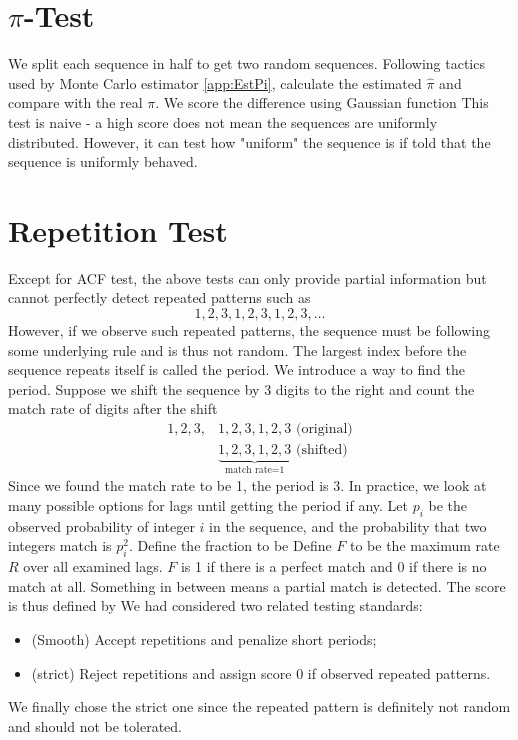 \documentclass{report}
\begin{document}
\section{$\pi$-Test}
We split each sequence in half to get two random sequences. Following tactics used by Monte Carlo estimator \eqref{app:EstPi}, calculate the estimated $\hat{\pi}$ and compare with the real $\pi$. We score the difference using Gaussian function
This test is naive - a high score does not mean the sequences are uniformly distributed. However, it can test how "uniform" the sequence is if told that the sequence is uniformly behaved.

\section{Repetition Test}
Except for ACF test, the above tests can only provide partial information but cannot perfectly detect repeated patterns such as
\[1,2,3,1,2,3,1,2,3,\dots\]
However, if we observe such repeated patterns, the sequence must be following some underlying rule and is thus not random. The largest index before the sequence repeats itself is called the period. We introduce a way to find the period. Suppose we shift the sequence by 3 digits to the right and count the match rate of digits after the shift
\begin{align*}
    1,2,3,&1,2,3,1,2,3 \text{ (original)}\\
    &\underbrace{1,2,3,1,2,3}_{\text{match rate=1}} \text{ (shifted)}
\end{align*}
Since we found the match rate to be 1, the period is 3. In practice, we look at many possible options for lags until getting the period if any. Let $p_i$ be the observed probability of integer $i$ in the sequence, and the probability that two integers match is $p_i^2$. Define the fraction to be
Define $F$ to be the maximum rate $R$ over all examined lags. $F$ is 1 if there is a perfect match and 0 if there is no match at all. Something in between means a partial match is detected. The score is thus defined by
We had considered two related testing standards:
\begin{itemize}
    \item (Smooth) Accept repetitions and penalize short periods;
    \item (strict) Reject repetitions and assign score 0 if observed repeated patterns.
\end{itemize}
We finally chose the strict one since the repeated pattern is definitely not random and should not be tolerated.
\end{document}
